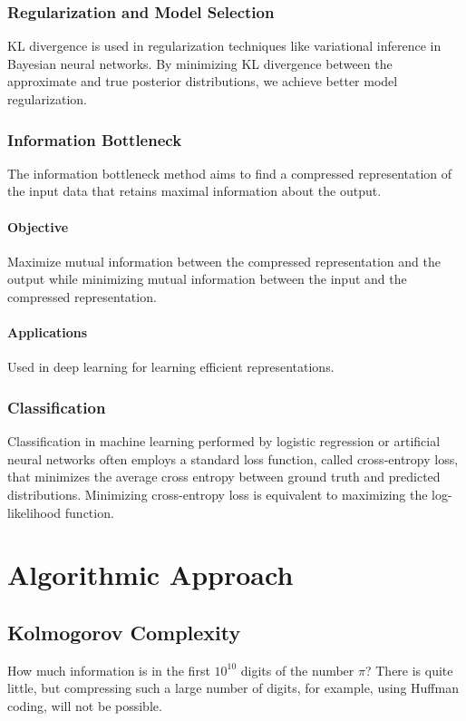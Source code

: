 \documentclass[12pt,sans]{article}
\theoremstyle{definition}
\theoremstyle{plain}
\theoremstyle{remark}
\begin{document}
\subsubsection{Regularization and Model Selection}

KL divergence is used in regularization techniques like variational inference in Bayesian neural networks. By minimizing KL divergence between the approximate and true posterior distributions, we achieve better model regularization.

\subsubsection{Information Bottleneck}

The information bottleneck method aims to find a compressed representation of the input data that retains maximal information about the output.

\paragraph{Objective} Maximize mutual information between the compressed representation and the output while minimizing mutual information between the input and the compressed representation.

\paragraph{Applications} Used in deep learning for learning efficient representations.

\subsubsection{Classification}
Classification in machine learning performed by logistic regression or artificial neural networks often employs a standard loss function, called cross-entropy loss, that minimizes the average cross entropy between ground truth and predicted distributions.
Minimizing cross-entropy loss is equivalent to maximizing the log-likelihood function.


\section{Algorithmic Approach}
\subsection{Kolmogorov Complexity}
How much information is in the first $10^{10}$ digits of the number $\pi$? There is quite little, but compressing such a large number of digits, for example, using Huffman coding, will not be possible.
\end{document}
